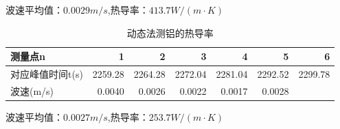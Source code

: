 \documentclass[11pt]{article}
\begin{document}
\begin{enumerate}
\begin{table}[H]
\begin{center}
            \end{center}
            波速平均值：$0.0029m/s$,\qquad 热导率：$413.7W/(m\cdot K)$
            
        \end{table}%

        \begin{table}[H]
          \centering
          \caption{动态法测铝的热导率}
            \begin{center}
                \begin{tabular}{|l|r|r|r|r|r|r|}\hline
                    测量点n  & 1     & 2     & 3     & 4     & 5     & 6 \\\hline
                    对应峰值时间t(s) & 2259.28 & 2264.28 & 2272.04 & 2281.04 & 2292.52 & 2299.78 \\\hline
                    波速(m/s) & 0.0040  & 0.0026  & 0.0022  & 0.0017  & 0.0028  &  \\\hline
                \end{tabular}%
            \end{center}
            波速平均值：$0.0027m/s$,\qquad 热导率：$253.7W/(m\cdot K)$
        \end{table}%


\end{enumerate}
\end{document}
